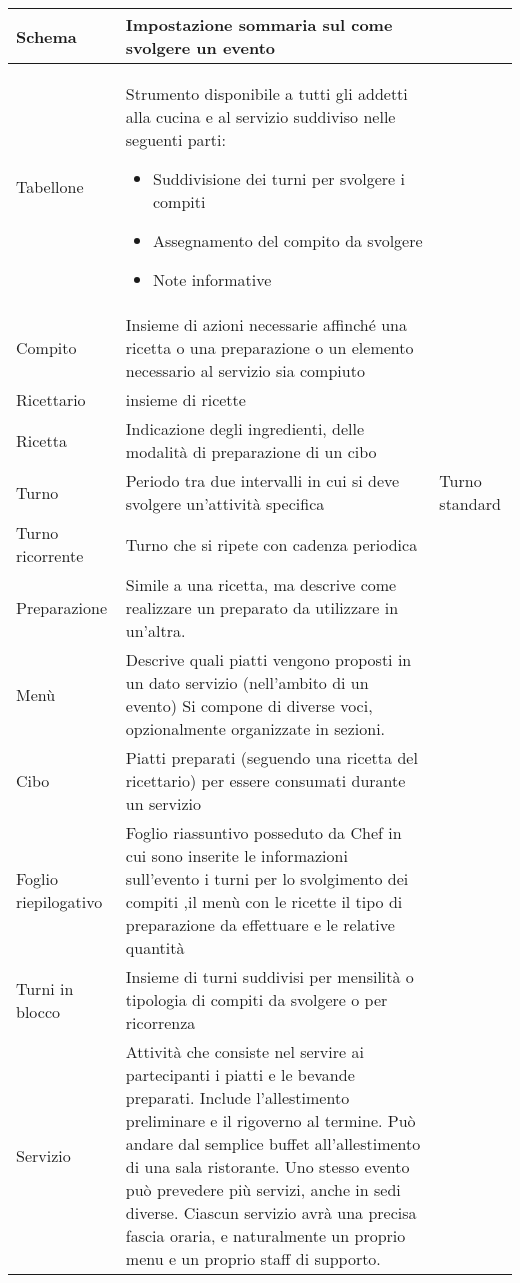 \begin{longtable}{|p{4cm}|p{4cm}|p{4cm}|}
  \hline
  Schema & Impostazione sommaria sul come svolgere un evento & \\
  \hline
  Tabellone & Strumento disponibile a tutti gli addetti alla cucina e al servizio suddiviso nelle seguenti parti: \begin{itemize} \item Suddivisione dei turni per svolgere i compiti \item Assegnamento del compito da svolgere \item Note informative \end{itemize} & \\
  \hline
  Compito & Insieme di azioni necessarie affinché una ricetta o una preparazione o un elemento necessario al servizio sia compiuto & \\
  \hline
  Ricettario & insieme di ricette & \\
  \hline
  Ricetta & Indicazione degli ingredienti, delle modalità di preparazione di un cibo & \\
  \hline
  Turno & Periodo tra due intervalli in cui si deve svolgere un'attività specifica & Turno standard \\
  \hline
  Turno ricorrente & Turno che si ripete con cadenza periodica & \\
  \hline
  Preparazione & Simile a una ricetta, ma descrive come realizzare un preparato da utilizzare in un'altra. & \\
  \hline
  Menù & Descrive quali piatti vengono proposti in un dato servizio (nell'ambito di un evento) Si compone di diverse voci, opzionalmente organizzate in sezioni. & \\
  \hline
  Cibo & Piatti preparati (seguendo una ricetta del ricettario) per essere consumati durante un servizio & \\
  \hline
  Foglio riepilogativo & Foglio riassuntivo posseduto da Chef in cui sono inserite le informazioni sull'evento i turni per lo svolgimento dei compiti ,il menù con le ricette il tipo di preparazione da effettuare e le relative quantità & \\
  \hline
  Turni in blocco & Insieme di turni suddivisi per mensilità o tipologia di compiti da svolgere o per ricorrenza & \\
  \hline
  Servizio & Attività che consiste nel servire ai partecipanti i piatti e le bevande preparati. Include l'allestimento preliminare e il rigoverno al termine. Può andare dal semplice buffet all'allestimento di una sala ristorante. Uno stesso evento può prevedere più servizi, anche in sedi diverse. Ciascun servizio avrà una precisa fascia oraria, e naturalmente un proprio menu e un proprio staff di supporto. & \\

\end{longtable}
